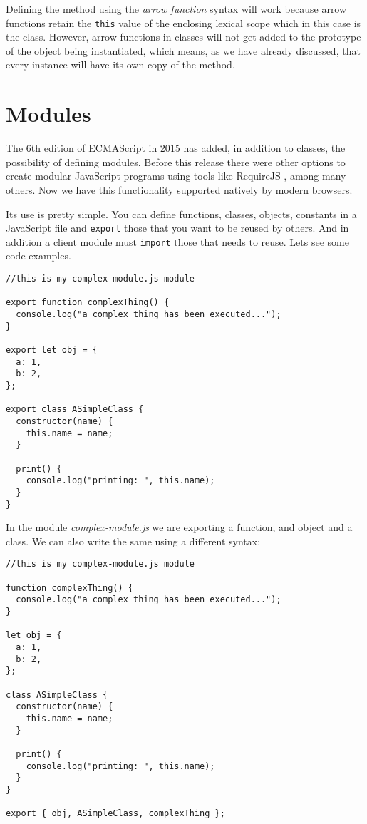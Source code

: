 \documentclass[a4paper, oneside, titlepage, 12pt]{book}
\begin{document}
Defining the method using the \textit{arrow function} syntax will work because arrow functions retain the \texttt{this} value of the enclosing lexical scope which in this case is the class. However, arrow functions in classes will not get added to the prototype of the object being instantiated, which means, as we have already discussed, that every instance will have its own copy of the method.

\section{Modules}
The 6th edition of ECMAScript in 2015 has added, in addition to classes, the possibility of defining modules. Before this release there were other options to create modular JavaScript programs using tools like RequireJS \cite{requirejs}, among many others. Now we have this functionality supported natively by modern browsers.

Its use is pretty simple. You can define functions, classes, objects, constants in a JavaScript file and \texttt{export} those that you want to be reused by others. And in addition a client module must \texttt{import} those that needs to reuse. Lets see some code examples.

\begin{verbatim}
//this is my complex-module.js module

export function complexThing() {
  console.log("a complex thing has been executed...");
}

export let obj = {
  a: 1,
  b: 2,
};

export class ASimpleClass {
  constructor(name) {
    this.name = name;
  }

  print() {
    console.log("printing: ", this.name);
  }
}
\end{verbatim}

In the module \textit{complex-module.js} we are exporting a function, and object and a class. We can also write the same using a different syntax:

\begin{verbatim}
//this is my complex-module.js module

function complexThing() {
  console.log("a complex thing has been executed...");
}

let obj = {
  a: 1,
  b: 2,
};

class ASimpleClass {
  constructor(name) {
    this.name = name;
  }

  print() {
    console.log("printing: ", this.name);
  }
}

export { obj, ASimpleClass, complexThing };
\end{verbatim}
\end{document}
